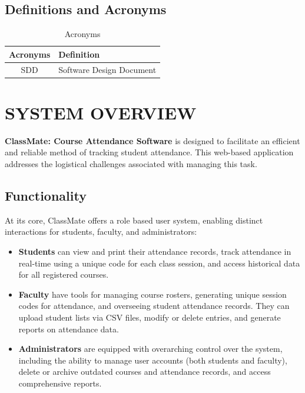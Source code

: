 \documentclass[letterpaper,12pt,oneside,listof=totoc]{scrreprt}
\begin{document}
\clearpage
\section{Definitions and Acronyms}

\begin{table}[H]
\begin{tabular}{| c | p{} |}
\hline
Acronyms     & Definition \\
\hline
SDD & Software Design Document \\
\hline
\end{tabular}
\caption{Acronyms}
\label{tab:Acronyms}
\end{table}

\chapter{SYSTEM OVERVIEW}
\textbf{ClassMate: Course Attendance Software} is designed to facilitate an efficient and reliable method of tracking student attendance. This web-based application addresses the logistical challenges associated with managing this task.

\section{Functionality}

At its core, ClassMate offers a role based user system, enabling distinct interactions for students, faculty, and administrators:

\begin{itemize}
    \item \textbf{Students} can view and print their attendance records, track attendance in real-time using a unique code for each class session, and access historical data for all registered courses.
    \item \textbf{Faculty} have tools for managing course rosters, generating unique session codes for attendance, and overseeing student attendance records. They can upload student lists via CSV files, modify or delete entries, and generate reports on attendance data.
    \item \textbf{Administrators} are equipped with overarching control over the system, including the ability to manage user accounts (both students and faculty), delete or archive outdated courses and attendance records, and access comprehensive reports.
\end{itemize}
\end{document}
